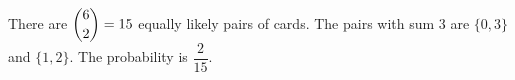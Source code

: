 There are $\dbinom62=15$ equally likely pairs of cards. The pairs with sum $3$ are $\{0,3\}$ and $\{1,2\}$. The probability is $\boxed{\dfrac{2}{15}}$.
